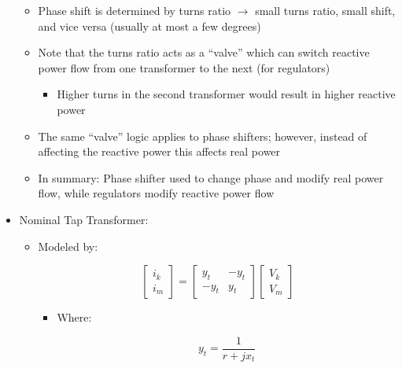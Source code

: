 \begin{itemize}
\begin{itemize}
      \item Phase shift is determined by turns ratio $\to$ small turns ratio, small shift, and vice versa (usually at most a few degrees)

      \item Note that the turns ratio acts as a ``valve'' which can switch reactive power flow from one transformer to the next (for regulators)

        \begin{itemize}

          \item Higher turns in the second transformer would result in higher reactive power

        \end{itemize}

      \item The same ``valve'' logic applies to phase shifters; however, instead of affecting the reactive power this affects real power

      \item In summary: Phase shifter used to change phase and modify real power flow, while regulators modify reactive power flow

    \end{itemize}

  \item Nominal Tap Transformer:

    \begin{itemize}

      \item Modeled by:

        $$\left[ \begin{matrix} i_k\\i_m\end{matrix} \right]=\left[ \begin{matrix} y_t & -y_t\\ -y_t & y_t\end{matrix} \right]\left[\begin{matrix} V_k\\V_m \end{matrix}\right]$$

        \begin{itemize}

          \item Where:

            $$y_t=\frac{1}{r+jx_t}$$

        \end{itemize}


\end{itemize}
\end{itemize}
